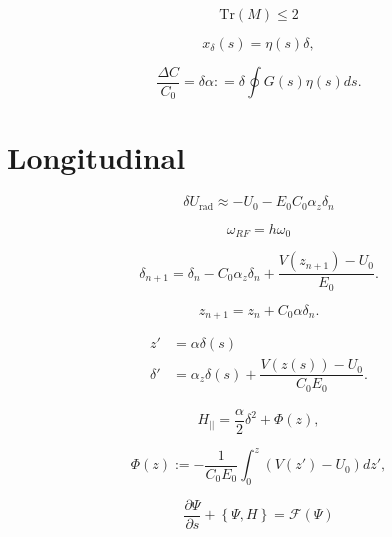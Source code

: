 \begin{equation}
    \mathrm{Tr}\left(M\right) \leq 2
\end{equation}

\begin{equation}
    x_\delta (s) = \eta(s) \delta, 
\end{equation}

\begin{equation}
    \dfrac{\Delta C}{C_0} = \delta\alpha  : = \delta \oint G(s) \eta(s) ds.
\end{equation}

\section{Longitudinal}


\begin{equation}
    \delta U_{\mathrm{rad}} \approx -U_0 - E_0C_0\alpha_z \delta_n
\end{equation}

\begin{equation}
    \omega_{RF} = h\omega_0
\end{equation}

\begin{equation}
    \delta_{n+1} = \delta_n - C_0 \alpha_z \delta_n + \dfrac{V(z_{n+1})-U_0}{E_0}.
\end{equation}

\begin{equation}
    z_{n+1} = z_n + C_0 \alpha \delta_n.
\end{equation}

\begin{align}
    z' & = \alpha\delta(s) \\
    \delta ' & = \alpha_z \delta(s) + \dfrac{V(z(s))-U_0}{C_0E_0}.
\end{align}

\begin{equation}
    H_{||} = \dfrac{\alpha}{2}\delta^2 + \Phi(z),
\end{equation}

\begin{equation}
    \Phi(z) := -\dfrac{1}{C_0 E_0}\int_0^z \left(V(z') - U_0\right)dz',
\end{equation}

\begin{equation}
    \dfrac{\partial \Psi}{\partial s} + \left\{\Psi , H\right\}  = \mathcal{F}\left(\Psi\right)
\end{equation}


